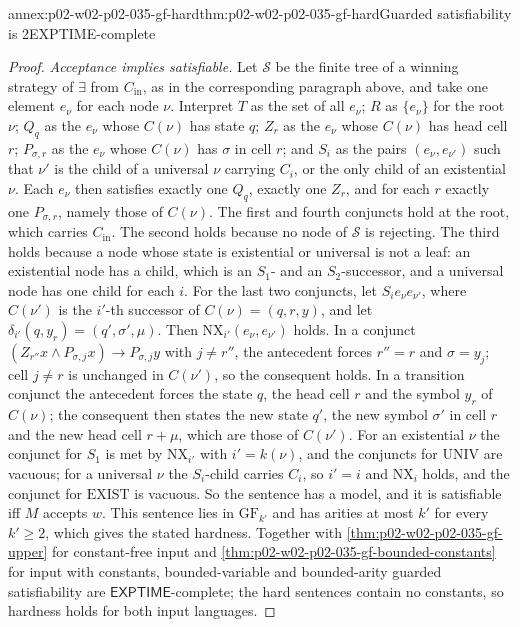 \begin{annexitem}{annex:p02-w02-p02-035-gf-hard}{thm:p02-w02-p02-035-gf-hard}{Guarded satisfiability is 2EXPTIME-complete}
\begin{proof}
\emph{Acceptance implies satisfiable.}  Let \(\mathcal S\) be the finite tree of
a winning strategy of \(\exists\) from \(C_{\mathrm{in}}\), as in the
corresponding paragraph above, and take one element \(e_\nu\) for each node
\(\nu\).  Interpret \(T\) as the set of all \(e_\nu\); \(R\) as \(\{e_\nu\}\)
for the root \(\nu\); \(Q_q\) as the \(e_\nu\) whose \(C(\nu)\) has state
\(q\); \(Z_r\) as the \(e_\nu\) whose \(C(\nu)\) has head cell \(r\);
\(P_{\sigma,r}\) as the \(e_\nu\) whose \(C(\nu)\) has \(\sigma\) in cell
\(r\); and \(S_i\) as the pairs \((e_\nu,e_{\nu'})\) such that \(\nu'\) is the child
of a universal \(\nu\) carrying \(C_i\), or the only child of an existential
\(\nu\).  Each \(e_\nu\) then satisfies exactly one \(Q_q\), exactly one
\(Z_r\), and for each \(r\) exactly one \(P_{\sigma,r}\), namely those of
\(C(\nu)\).  The first and fourth conjuncts hold at the root, which carries
\(C_{\mathrm{in}}\).  The second holds because no node of \(\mathcal S\) is
rejecting.  The third holds because a node whose state is existential or
universal is not a leaf: an existential node has a child, which is an
\(S_1\)- and an \(S_2\)-successor, and a universal node has one child for each
\(i\).  For the last two conjuncts, let \(S_ie_\nu e_{\nu'}\), where
\(C(\nu')\) is the \(i'\)-th successor of \(C(\nu)=(q,r,y)\), and let
\(\delta_{i'}(q,y_r)=(q',\sigma',\mu)\).  Then \(\mathrm{NX}_{i'}(e_\nu,e_{\nu'})\)
holds.  In a conjunct \((Z_{r''}x\land P_{\sigma,j}x)\to P_{\sigma,j}y\) with
\(j\neq r''\), the antecedent forces \(r''=r\) and \(\sigma=y_j\); cell
\(j\neq r\) is unchanged in \(C(\nu')\), so the consequent holds.  In a
transition conjunct the antecedent forces the state \(q\), the head cell
\(r\) and the symbol \(y_r\) of \(C(\nu)\); the consequent then states the
new state \(q'\), the new symbol \(\sigma'\) in cell \(r\) and the new head
cell \(r+\mu\), which are those of \(C(\nu')\).  For an existential \(\nu\)
the conjunct for \(S_1\) is met by \(\mathrm{NX}_{i'}\) with \(i'=k(\nu)\), and
the conjuncts for \(\mathrm{UNIV}\) are vacuous; for a universal \(\nu\) the
\(S_i\)-child carries \(C_i\), so \(i'=i\) and \(\mathrm{NX}_i\) holds, and
the conjunct for \(\mathrm{EXIST}\) is vacuous.  So the sentence has a
model, and it is satisfiable iff \(M\) accepts \(w\).
This sentence lies in \(\mathrm{GF}_{k'}\) and has arities at most \(k'\) for
every \(k'\geq2\), which gives the stated hardness.  Together with
\cref{thm:p02-w02-p02-035-gf-upper} for constant-free input and
\cref{thm:p02-w02-p02-035-gf-bounded-constants} for input with constants,
bounded-variable and bounded-arity guarded satisfiability are
\(\mathsf{EXPTIME}\)-complete; the hard sentences contain no constants, so
hardness holds for both input languages.
\end{proof}
\end{annexitem}
